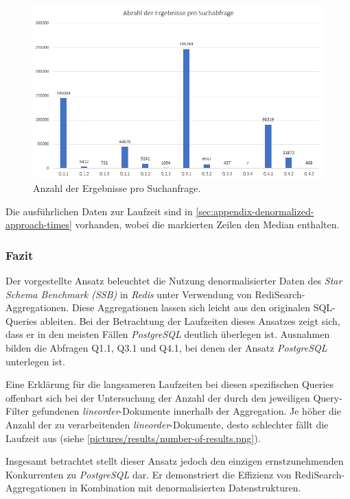 \newpage
\begin{figure}[h]  %
    \centering      %
    \includegraphics[width=1\textwidth]{pictures/results/number-of-results.png}
    \caption{Anzahl der Ergebnisse pro Suchanfrage.}      %
    \label{pic:number-of-results}    %
\end{figure}

\newpage

Die ausführlichen Daten zur Laufzeit sind in \cref{sec:appendix-denormalized-approach-times} vorhanden, wobei die markierten Zeilen den Median enthalten.
\newpage
\subsubsection{Fazit}
Der vorgestellte Ansatz beleuchtet die Nutzung denormalisierter Daten des \emph{Star Schema Benchmark (SSB)} in \emph{Redis} unter Verwendung von RediSearch-Aggregationen. Diese Aggregationen lassen sich leicht aus den originalen SQL-Queries ableiten. Bei der Betrachtung der Laufzeiten dieses Ansatzes zeigt sich, dass er in den meisten Fällen \emph{PostgreSQL} deutlich überlegen ist. Ausnahmen bilden die Abfragen Q1.1, Q3.1 und Q4.1, bei denen der Ansatz \emph{PostgreSQL} unterlegen ist.


Eine Erklärung für die langsameren Laufzeiten bei diesen spezifischen Queries offenbart sich bei der Untersuchung der Anzahl der durch den jeweiligen Query-Filter gefundenen \emph{lineorder}-Dokumente innerhalb der Aggregation. Je höher die Anzahl der zu verarbeitenden \emph{lineorder}-Dokumente, desto schlechter fällt die Laufzeit aus (siehe \cref{pictures/results/number-of-results.png}). 

Insgesamt betrachtet stellt dieser Ansatz jedoch den einzigen ernstzunehmenden Konkurrenten zu \emph{PostgreSQL} dar. Er demonstriert die Effizienz von RediSearch-Aggregationen in Kombination mit denormalisierten Datenstrukturen.




